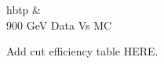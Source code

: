 \documentclass{cmspaper}
\begin{document}
\begin{2figures}{hbtp}
   &
   \\
\caption{900 GeV Data Vs MC}
 \label{fig:ecal_noise_1}
\end{2figures}

Add cut efficiency table HERE.
\end{document}
